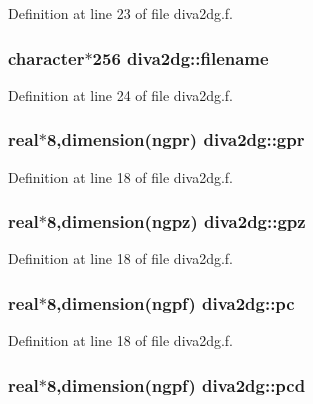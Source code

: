 Definition at line 23 of file diva2dg.f.\hypertarget{namespacediva2dg_698afd231129418ec2b8c08ee235931d}{
\subsubsection[filename]{\setlength{\rightskip}{0pt plus 5cm}character$\ast$256 {\bf diva2dg::filename}}}
\label{namespacediva2dg_698afd231129418ec2b8c08ee235931d}




Definition at line 24 of file diva2dg.f.\hypertarget{namespacediva2dg_35a63eee0b80c66baac30a3de0be0be9}{
\subsubsection[gpr]{\setlength{\rightskip}{0pt plus 5cm}real$\ast$8,dimension(ngpr) {\bf diva2dg::gpr}}}
\label{namespacediva2dg_35a63eee0b80c66baac30a3de0be0be9}




Definition at line 18 of file diva2dg.f.\hypertarget{namespacediva2dg_b3cfb25ed528c0d24d80d968099c69ea}{
\subsubsection[gpz]{\setlength{\rightskip}{0pt plus 5cm}real$\ast$8,dimension(ngpz) {\bf diva2dg::gpz}}}
\label{namespacediva2dg_b3cfb25ed528c0d24d80d968099c69ea}




Definition at line 18 of file diva2dg.f.\hypertarget{namespacediva2dg_cdb5a604b2a0c574c93685c0135a1cb1}{
\subsubsection[pc]{\setlength{\rightskip}{0pt plus 5cm}real$\ast$8,dimension(ngpf) {\bf diva2dg::pc}}}
\label{namespacediva2dg_cdb5a604b2a0c574c93685c0135a1cb1}




Definition at line 18 of file diva2dg.f.\hypertarget{namespacediva2dg_002854ccd8f06e9862a53c8e55667130}{
\subsubsection[pcd]{\setlength{\rightskip}{0pt plus 5cm}real$\ast$8,dimension(ngpf) {\bf diva2dg::pcd}}}
\label{namespacediva2dg_002854ccd8f06e9862a53c8e55667130}





